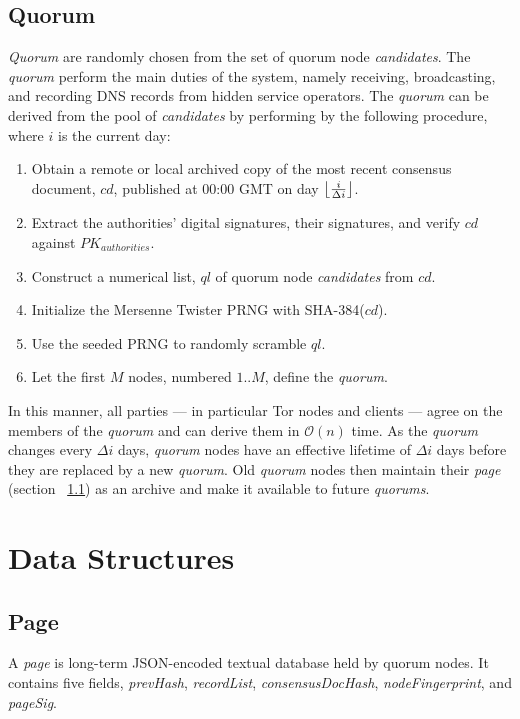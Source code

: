 \subsection{Quorum}
\label{sec:Quorum}

\emph{Quorum} are randomly chosen from the set of quorum node \emph{candidates}. The \emph{quorum} perform the main duties of the system, namely receiving, broadcasting, and recording DNS records from hidden service operators. The \emph{quorum} can be derived from the pool of \emph{candidates} by performing by the following procedure, where $ i $ is the current day:

\begin{enumerate}
	\item Obtain a remote or local archived copy of the most recent consensus document, $ cd $, published at 00:00 GMT on day $ \floor[\big]{\frac{i}{\Delta i}} $.
	\item Extract the authorities' digital signatures, their signatures, and verify $ cd $ against $ PK_{authorities} $.
	\item Construct a numerical list, $ ql $ of quorum node \emph{candidates} from $ cd $.
	\item Initialize the Mersenne Twister PRNG with SHA-384($ cd $).
	\item Use the seeded PRNG to randomly scramble $ ql $.
	\item Let the first $ M $ nodes, numbered $ 1 .. M $, define the \emph{quorum}.
\end{enumerate}

In this manner, all parties --- in particular Tor nodes and clients --- agree on the members of the \emph{quorum} and can derive them in $ \mathcal{O}(n) $ time. As the \emph{quorum} changes every $ \Delta i $ days, \emph{quorum} nodes have an effective lifetime of $ \Delta i $ days before they are replaced by a new \emph{quorum}. Old \emph{quorum} nodes then maintain their \emph{page} (section ~\ref{sec:Page}) as an archive and make it available to future \emph{quorums}.

\section{Data Structures}

\subsection{Page}
\label{sec:Page}

A \emph{page} is long-term JSON-encoded textual database held by quorum nodes. It contains five fields, \emph{prevHash}, \emph{recordList}, \emph{consensusDocHash}, \emph{nodeFingerprint}, and \emph{pageSig}. 

